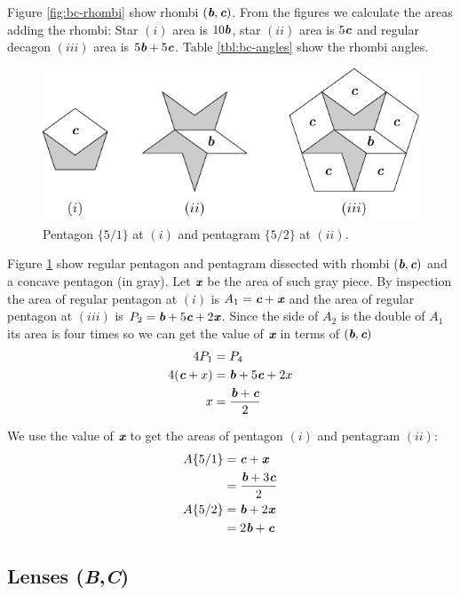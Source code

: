 \documentclass[11pt]{article}
\def\mathbi#1{\textbf{\em #1}}
\begin{document}
Figure \ref{fig:bc-rhombi} show rhombi $(\mathbi{b},\mathbi{c})$. 
From the figures we calculate the areas adding the rhombi:
Star $(i)$ area is $10\mathbi{b}$, star $(ii)$ area is $5\mathbi{c}$ and 
regular decagon $(iii)$ area is $5\mathbi{b} + 5\mathbi{c}$. Table \ref {tbl:bc-angles} show the rhombi angles.

\begin{figure}[H]
\centering
\includegraphics[scale=1.1]{bc/penta}
\caption{Pentagon $\{5/1\}$ at $(i)$ and pentagram $\{5/2\}$ at $(ii)$.}
\label{fig:bc-penta}
\end{figure}

Figure \ref{fig:bc-penta} show regular pentagon and pentagram dissected with rhombi $(\mathbi{b},\mathbi{c})$ and a concave pentagon (in gray). Let $\mathbi{x}$ be the area of such gray piece. By inspection the area of regular pentagon at $(i)$ is $A_1 = \mathbi{c} + \mathbi{x}$ and the area of regular pentagon at $(iii)$ is $P_2 = \mathbi{b} + 5\mathbi{c} + 2\mathbi{x}$. Since the side of $A_2$ is the double of $A_1$ its area is four times so we can get the value of $\mathbi{x}$ in terms of $(\mathbi{b},\mathbi{c})$
\begin{align}
4P_1 &= P_4 \nonumber\\
4(\mathbi{c} + x) &= \mathbi{b} + 5\mathbi{c} + 2x\nonumber\\
x &= \frac{\mathbi{b} + \mathbi{c}}2
\end{align}

We use the value of $\mathbi{x}$ to get the areas of pentagon $(i)$ and pentagram $(ii)$:
\begin{align}
A\{5/1\} &= \mathbi{c} + \mathbi{x} \nonumber\\
 &= \frac{\mathbi{b} + 3\mathbi{c}}2 \\
A\{5/2\} &= \mathbi{b} + 2\mathbi{x} \nonumber\\
 &= 2\mathbi{b} + \mathbi{c}
\end{align}

\subsection{Lenses (\mathbi{B},\mathbi{C})}
\end{document}
